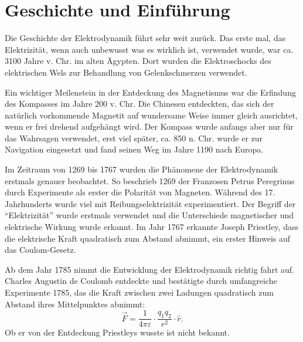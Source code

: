 %
%
%
%
\section{Geschichte und Einführung\label{maxwell:section:teil0}}
Die Geschichte der Elektrodynamik führt sehr weit zurück.
Das erste mal, das Elektrizität, wenn auch unbewusst was es wirklich ist, verwendet wurde, war ca. 3100 Jahre v. Chr. im alten Ägypten.
Dort wurden die Elektroschocks des elektrischen Wels zur Behandlung von Gelenkschmerzen verwendet.


Ein wichtiger Meilenstein in der Entdeckung des Magnetismus war die Erfindung des Kompasses im Jahre 200 v. Chr.
Die Chinesen entdeckten, das sich der natürlich vorkommende Magnetit auf wundersame Weise immer gleich ausrichtet, wenn er frei drehend aufgehängt wird.
Der Kompass wurde anfangs aber nur für das Wahrsagen verwendet, erst viel später, ca. 850 n. Chr. wurde er zur Navigation eingesetzt und fand seinen Weg im Jahre 1190 nach Europa.

Im Zeitraum von 1269 bis 1767 wurden die Phänomene der Elektrodynamik erstmals genauer beobachtet.
So beschrieb 1269 der Franzosen Petrus Peregrinus durch Experimente als erster die Polarität von Magneten.
Während des 17. Jahrhunderts wurde viel mit Reibungselektrizität experimentiert. Der Begriff der ``Elektrizität'' wurde erstmals verwendet und die Unterschiede magnetischer und elektrische Wirkung wurde erkannt.
Im Jahr 1767 erkannte Joseph Priestley, dass die elektrische Kraft quadratisch zum Abstand abnimmt, ein erster Hinweis auf das Coulom-Gesetz.

Ab dem Jahr 1785 nimmt die Entwicklung der Elektrodynamik richtig fahrt auf.
Charles Augustin de Coulomb entdeckte und bestätigte durch umfangreiche Experimente 1785, das die Kraft zwischen zwei Ladungen quadratisch zum Abstand ihres Mittelpunktes abnimmt:
$$
\vec{F}
=
\frac{1}{4 \pi \varepsilon}
\cdot
\frac{q_1 q_2}{r^2}
\cdot
\hat{r}.
$$
Ob er von der Entdeckung Priestleys wusste ist nicht bekannt.

